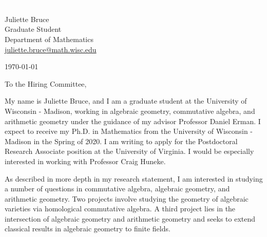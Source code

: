 \documentclass[11pt]{article}
\begin{document}
\section*{}

\noindent
\begin{minipage}{0.99\textwidth}
\begin{minipage}{0.69\textwidth}
\textcolor{white}{.}
\end{minipage}
\begin{minipage}{0.29\textwidth}
{
Juliette Bruce \\
Graduate Student \\
Department of Mathematics \\
\href{mailto:juliette.bruce@math.wisc.edu}{juliette.bruce@math.wisc.edu}
}

\vspace{12pt}
\today
\end{minipage}
\end{minipage}


\vspace{12pt}
\noindent
To the Hiring Committee,

My name is Juliette Bruce, and I am a graduate student at the University of Wisconsin - Madison, working in algebraic geometry, commutative algebra, and arithmetic geometry under the guidance of my advisor Professor Daniel Erman. I expect to receive my Ph.D. in Mathematics from the University of Wisconsin - Madison in the Spring of 2020. I am writing to apply for the Postdoctoral Research Associate position at the University of Virginia. I would be especially interested in working with Professor Craig Huneke. 

As described in more depth in my research statement, I am interested in studying a number of questions in commutative algebra, algebraic geometry, and arithmetic geometry. Two projects involve studying the geometry of algebraic varieties via homological commutative algebra. A third project lies in the intersection of algebraic geometry and arithmetic geometry and seeks to extend classical results in algebraic geometry to finite fields. 
\end{document}
